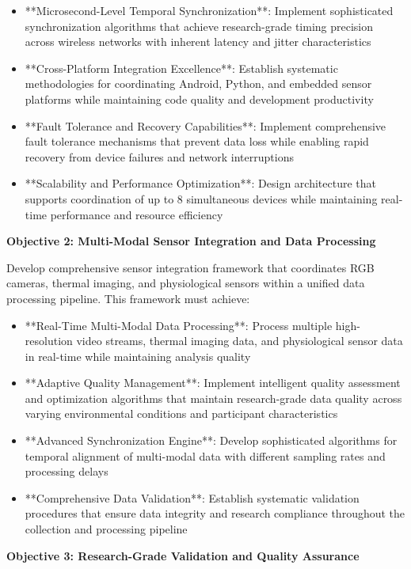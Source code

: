 \documentclass[11pt,a4paper]{report}
\begin{document}
\begin{itemize}
\item **Microsecond-Level Temporal Synchronization**: Implement sophisticated synchronization algorithms that achieve
  research-grade timing precision across wireless networks with inherent latency and jitter characteristics
\item **Cross-Platform Integration Excellence**: Establish systematic methodologies for coordinating Android, Python, and
  embedded sensor platforms while maintaining code quality and development productivity
\item **Fault Tolerance and Recovery Capabilities**: Implement comprehensive fault tolerance mechanisms that prevent data
  loss while enabling rapid recovery from device failures and network interruptions
\item **Scalability and Performance Optimization**: Design architecture that supports coordination of up to 8 simultaneous
  devices while maintaining real-time performance and resource efficiency

\end{itemize}
\textbf{Objective 2: Multi-Modal Sensor Integration and Data Processing}

Develop comprehensive sensor integration framework that coordinates RGB cameras, thermal imaging, and physiological
sensors within a unified data processing pipeline. This framework must achieve:

\begin{itemize}
\item **Real-Time Multi-Modal Data Processing**: Process multiple high-resolution video streams, thermal imaging data, and
  physiological sensor data in real-time while maintaining analysis quality
\item **Adaptive Quality Management**: Implement intelligent quality assessment and optimization algorithms that maintain
  research-grade data quality across varying environmental conditions and participant characteristics
\item **Advanced Synchronization Engine**: Develop sophisticated algorithms for temporal alignment of multi-modal data with
  different sampling rates and processing delays
\item **Comprehensive Data Validation**: Establish systematic validation procedures that ensure data integrity and research
  compliance throughout the collection and processing pipeline

\end{itemize}
\textbf{Objective 3: Research-Grade Validation and Quality Assurance}
\end{document}
